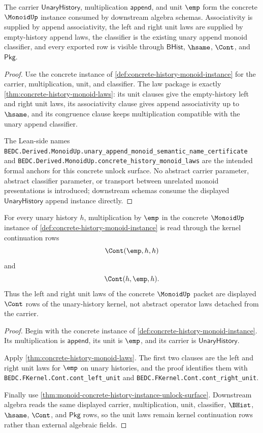 \begin{theorem}
\label{thm:monoid-concrete-history-instance-unlock-surface}
The carrier $\mathsf{UnaryHistory}$, multiplication $\mathsf{append}$, and unit $\emp$ form the concrete $\MonoidUp$ instance consumed by downstream algebra schemas. Associativity is supplied by append associativity, the left and right unit laws are supplied by empty-history append laws, the classifier is the existing unary append monoid classifier, and every exported row is visible through $\mathsf{BHist}$, $\hsame$, $\Cont$, and $\mathsf{Pkg}$.
\end{theorem}
\begin{proof}
Use the concrete instance of \autoref{def:concrete-history-monoid-instance} for the carrier, multiplication, unit, and classifier. The law package is exactly \autoref{thm:concrete-history-monoid-laws}: its unit clauses give the empty-history left and right unit laws, its associativity clause gives append associativity up to $\hsame$, and its congruence clause keeps multiplication compatible with the unary append classifier.

The Lean-side names \texttt{BEDC.Derived.MonoidUp.unary\_append\_monoid\_semantic\_name\_certificate} and \texttt{BEDC.Derived.MonoidUp.concrete\_history\_monoid\_laws} are the intended formal anchors for this concrete unlock surface. No abstract carrier parameter, abstract classifier parameter, or transport between unrelated monoid presentations is introduced; downstream schemas consume the displayed $\mathsf{UnaryHistory}$ append instance directly.
\end{proof}

\begin{theorem}
\label{thm:monoid-unary-cont-unit-replay}
For every unary history $h$, multiplication by $\emp$ in the concrete $\MonoidUp$ instance of \autoref{def:concrete-history-monoid-instance} is read through the kernel continuation rows
$$
\Cont(\emp,h,h)
$$
and
$$
\Cont(h,\emp,h).
$$
Thus the left and right unit laws of the concrete $\MonoidUp$ packet are displayed $\Cont$ rows of the unary-history kernel, not abstract operator laws detached from the carrier.
\end{theorem}
\begin{proof}
Begin with the concrete instance of \autoref{def:concrete-history-monoid-instance}. Its multiplication is $\mathsf{append}$, its unit is $\emp$, and its carrier is $\mathsf{UnaryHistory}$.

Apply \autoref{thm:concrete-history-monoid-laws}. The first two clauses are the left and right unit laws for $\emp$ on unary histories, and the proof identifies them with \texttt{BEDC.FKernel.Cont.cont\_left\_unit} and \texttt{BEDC.FKernel.Cont.cont\_right\_unit}.

Finally use \autoref{thm:monoid-concrete-history-instance-unlock-surface}. Downstream algebra reads the same displayed carrier, multiplication, unit, classifier, $\BHist$, $\hsame$, $\Cont$, and $\mathsf{Pkg}$ rows, so the unit laws remain kernel continuation rows rather than external algebraic fields.
\end{proof}

